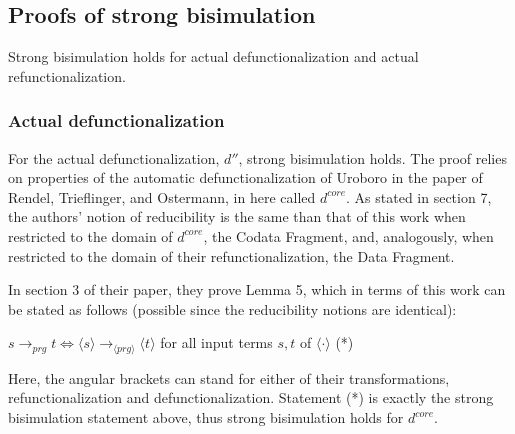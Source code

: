 \documentclass[11pt]{article} %
\begin{document}
\subsection{Proofs of strong bisimulation}

Strong bisimulation holds for actual defunctionalization and actual refunctionalization.

\subsubsection{Actual defunctionalization}

For the actual defunctionalization, $d''$, strong bisimulation holds. The proof relies on properties of the automatic defunctionalization of Uroboro in the paper of Rendel, Trieflinger, and Ostermann, in here called $d^{core}$. As stated in section 7, the authors' notion of reducibility is the same than that of this work when restricted to the domain of $d^{core}$, the Codata Fragment, and, analogously, when restricted to the domain of their refunctionalization, the Data Fragment.

In section 3 of their paper, they prove Lemma 5, which in terms of this work can be stated as follows (possible since the reducibility notions are identical):

$s \longrightarrow_{prg} t \iff \langle s \rangle \longrightarrow_{\langle prg \rangle} \langle t \rangle$ for all input terms $s,t$ of $\langle \cdot \rangle$ (*)

Here, the angular brackets can stand for either of their transformations, refunctionalization and defunctionalization. Statement (*) is exactly the strong bisimulation statement above, thus strong bisimulation holds for $d^{core}$.
\end{document}
